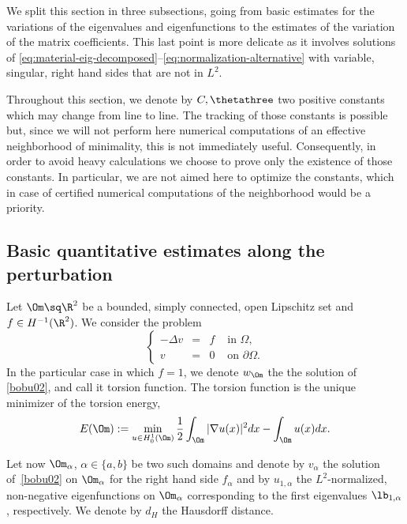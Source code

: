 \smallskip
We split this section in three subsections, going from basic estimates for the variations of the eigenvalues and eigenfunctions to the estimates of the variation of the matrix coefficients. This last point is more delicate as it involves solutions of \eqref{eq:material-eig-decomposed}--\eqref{eq:normalization-alternative} with variable, singular, right hand sides that are not in $L^2$.

Throughout this section, we denote by $C, \thetathree$ two positive constants which may change from line to line.
The tracking of those constants is possible but, since we will not perform here numerical computations of an effective neighborhood of minimality, this is not immediately useful. Consequently, in order to avoid heavy calculations we choose to prove only the existence of those constants. In particular, we are not aimed here to optimize the constants, which in case of certified numerical computations of the neighborhood would be a priority.

\subsection{Basic quantitative estimates along the perturbation}
Let $\Om \sq \R^2$ be a bounded, simply connected, open Lipschitz set and $f \in H^{-1} (\R^2)$. We consider the problem\vspace*{-3pt}\enlargethispage{.5\baselineskip}
\begin{equation}\label{bobu02}
\left\{ \begin{array}{rcll}
-\Delta v & =& f & \text{ in }\Omega,\\
v &= &0 & \text{ on }\partial \Omega.
\end{array} \right.
\end{equation}
In the particular case in which $f=1$, we denote $w_{\Om}$ the the solution of \eqref{bobu02}, and call it torsion function. The torsion function is the unique minimizer of the torsion energy,\vspace*{-3pt}
\[
E(\Om):= \min_{u \in H^1_0(\Om)} \frac 12 \int_\Om |\nabla u(x) |^2 dx -\int_\Om u(x) dx.
\]

Let now $\Om_\alpha$, $\alpha\in \{a,b\}$ be two such domains and denote by $v_\alpha$ the solution of~\eqref{bobu02} on $\Om_\alpha $ for the right hand side $f_\alpha$ and by $u_{1,\alpha}$ the $L^2$-normalized, non-negative eigenfunctions on $\Om_\alpha$ corresponding to the first eigenvalues $\lb_{1,\alpha}$, respectively. We denote by $d_H$ the Hausdorff distance.

